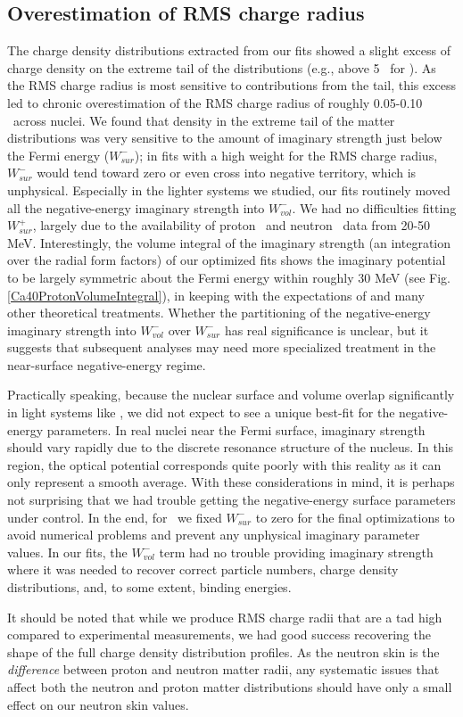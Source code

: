 \subsection{Overestimation of RMS charge radius}
The charge density distributions extracted from our fits showed a slight
excess of charge density on the extreme tail of the distributions (e.g., above 5 
\femto\meter\ for \caForty). As the RMS charge radius is most sensitive to
contributions from the tail, this excess led to chronic overestimation of the RMS
charge radius of roughly 0.05-0.10 \femto\meter\ across nuclei.
We found that density in the extreme tail of the matter distributions was very
sensitive to the amount of imaginary strength just below the Fermi energy
($W_{sur}^{-}$); in fits with a high weight for the RMS charge radius,
$W_{sur}^{-}$ would tend toward zero or even cross into negative territory,
which is unphysical. Especially in the lighter systems we studied, our fits routinely
moved all the negative-energy imaginary strength into $W_{vol}^{-}$.
We had no difficulties fitting $W_{sur}^{+}$, largely due to the
availability of proton \rxn\ and neutron \tot\ data from 20-50 MeV.
Interestingly, the volume
integral of the imaginary strength (an integration over the
radial form factors) of our optimized fits shows the imaginary potential to be largely symmetric
about the Fermi energy within roughly 30 MeV (see Fig. \ref{Ca40ProtonVolumeIntegral}),
in keeping with the expectations of \cite{Mahaux1991} and many other theoretical
treatments. Whether the partitioning
of the negative-energy imaginary strength into $W_{vol}^{-}$ over $W_{sur}^{-}$
has real significance is unclear, but it suggests that subsequent 
analyses may need more specialized treatment in the near-surface negative-energy
regime.

Practically speaking, because the nuclear surface and volume overlap
significantly in light systems like \oSix, we did not expect to see a unique best-fit for the
negative-energy parameters. In real nuclei near the Fermi surface,
imaginary strength should vary rapidly due to the discrete resonance structure of
the nucleus. In this region, the optical potential corresponds quite poorly
with this reality as it can only represent a smooth average. With these
considerations in mind, it is perhaps
not surprising that we had trouble getting
the negative-energy surface parameters under control. In the end, for
\oSixEight\ we fixed $W_{sur}^{-}$ to zero for
the final optimizations to avoid numerical problems and prevent any
unphysical imaginary parameter values. In our fits, the
$W_{vol}^{-}$ term had no trouble providing imaginary strength where it was
needed to recover correct particle numbers, charge density distributions, and,
to some extent, binding energies.

It should be noted that while we produce RMS charge radii that are a tad high
compared to experimental measurements, we had good success recovering the shape
of the full charge density distribution profiles. As the neutron skin is the
\textit{difference} between proton and neutron matter radii, any systematic
issues that affect both the neutron and proton matter distributions should have
only a small effect on our neutron skin values.
\afterpage{\clearpage}
